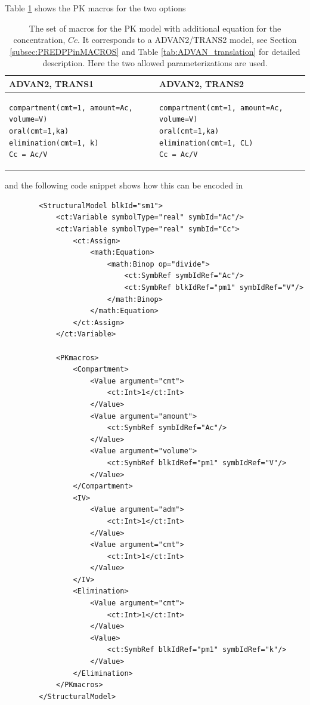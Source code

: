 Table \ref{tab:ADVAN2TRANS1reparameterisation} shows the PK macros for the two options
\begin{table}[ht]
\begin{center}
\begin{tabular*}{.9\textwidth}{@{\extracolsep{\fill} } ll}
  \hline
  \hline
ADVAN2, TRANS1 & ADVAN2, TRANS2 \\
  \hline
\lstset{language=NONMEMdataSet}
\begin{lstlisting}
compartment(cmt=1, amount=Ac, volume=V)
oral(cmt=1,ka)
elimination(cmt=1, k)
Cc = Ac/V
\end{lstlisting}
&
\lstset{language=NONMEMdataSet}
\begin{lstlisting}
compartment(cmt=1, amount=Ac, volume=V)
oral(cmt=1,ka)
elimination(cmt=1, CL)
Cc = Ac/V
\end{lstlisting}

\end{tabular*}
\caption{The set of macros for the PK model with additional equation for the 
concentration, $Cc$. It corresponds to a ADVAN2/TRANS2 model, see 
Section \ref{subsec:PREDPPinMACROS} and Table \ref{tab:ADVAN_translation} 
for detailed description. Here the two allowed parameterizations are used.}
\label{tab:ADVAN2TRANS1reparameterisation}
\end{center}
\end{table}
and the following code snippet shows how this can be encoded in \pml
\lstset{language=XML}
\begin{lstlisting}
        <StructuralModel blkId="sm1">
            <ct:Variable symbolType="real" symbId="Ac"/>
            <ct:Variable symbolType="real" symbId="Cc">
                <ct:Assign>
                    <math:Equation>
                        <math:Binop op="divide">
                            <ct:SymbRef symbIdRef="Ac"/>
                            <ct:SymbRef blkIdRef="pm1" symbIdRef="V"/>
                        </math:Binop>
                    </math:Equation>
                </ct:Assign>
            </ct:Variable>
            
            <PKmacros>
                <Compartment>
                    <Value argument="cmt">
                        <ct:Int>1</ct:Int>
                    </Value>
                    <Value argument="amount">
                        <ct:SymbRef symbIdRef="Ac"/>
                    </Value>
                    <Value argument="volume">
                        <ct:SymbRef blkIdRef="pm1" symbIdRef="V"/>
                    </Value>
                </Compartment>
                <IV>
                    <Value argument="adm">
                        <ct:Int>1</ct:Int>
                    </Value>
                    <Value argument="cmt">
                        <ct:Int>1</ct:Int>
                    </Value>
                </IV>
                <Elimination>
                    <Value argument="cmt">
                        <ct:Int>1</ct:Int>
                    </Value>
                    <Value>
                        <ct:SymbRef blkIdRef="pm1" symbIdRef="k"/>
                    </Value>
                </Elimination>
            </PKmacros>
        </StructuralModel>
\end{lstlisting}
